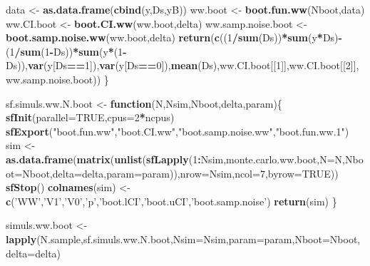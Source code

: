 \documentclass[]{book}
\newenvironment{Shaded}{\begin{snugshade}}{\end{snugshade}}
\newcommand{\KeywordTok}[1]{\textcolor[rgb]{0.13,0.29,0.53}{\textbf{#1}}}
\newcommand{\DataTypeTok}[1]{\textcolor[rgb]{0.13,0.29,0.53}{#1}}
\newcommand{\DecValTok}[1]{\textcolor[rgb]{0.00,0.00,0.81}{#1}}
\newcommand{\StringTok}[1]{\textcolor[rgb]{0.31,0.60,0.02}{#1}}
\newcommand{\OtherTok}[1]{\textcolor[rgb]{0.56,0.35,0.01}{#1}}
\newcommand{\ControlFlowTok}[1]{\textcolor[rgb]{0.13,0.29,0.53}{\textbf{#1}}}
\newcommand{\OperatorTok}[1]{\textcolor[rgb]{0.81,0.36,0.00}{\textbf{#1}}}
\newcommand{\NormalTok}[1]{#1}
\theoremstyle{definition}
\theoremstyle{definition}
\theoremstyle{definition}
\theoremstyle{remark}
\begin{document}
\begin{Shaded}
\begin{Highlighting}[]
\NormalTok{  data <-}\StringTok{ }\KeywordTok{as.data.frame}\NormalTok{(}\KeywordTok{cbind}\NormalTok{(y,Ds,yB))}
\NormalTok{  ww.boot <-}\StringTok{ }\KeywordTok{boot.fun.ww}\NormalTok{(Nboot,data)}
\NormalTok{  ww.CI.boot <-}\StringTok{ }\KeywordTok{boot.CI.ww}\NormalTok{(ww.boot,delta)}
\NormalTok{  ww.samp.noise.boot <-}\StringTok{ }\KeywordTok{boot.samp.noise.ww}\NormalTok{(ww.boot,delta)}
  \KeywordTok{return}\NormalTok{(}\KeywordTok{c}\NormalTok{((}\DecValTok{1}\OperatorTok{/}\KeywordTok{sum}\NormalTok{(Ds))}\OperatorTok{*}\KeywordTok{sum}\NormalTok{(y}\OperatorTok{*}\NormalTok{Ds)}\OperatorTok{-}\NormalTok{(}\DecValTok{1}\OperatorTok{/}\KeywordTok{sum}\NormalTok{(}\DecValTok{1}\OperatorTok{-}\NormalTok{Ds))}\OperatorTok{*}\KeywordTok{sum}\NormalTok{(y}\OperatorTok{*}\NormalTok{(}\DecValTok{1}\OperatorTok{-}\NormalTok{Ds)),}\KeywordTok{var}\NormalTok{(y[Ds}\OperatorTok{==}\DecValTok{1}\NormalTok{]),}\KeywordTok{var}\NormalTok{(y[Ds}\OperatorTok{==}\DecValTok{0}\NormalTok{]),}\KeywordTok{mean}\NormalTok{(Ds),ww.CI.boot[[}\DecValTok{1}\NormalTok{]],ww.CI.boot[[}\DecValTok{2}\NormalTok{]],ww.samp.noise.boot))}
\NormalTok{\}}

\NormalTok{sf.simuls.ww.N.boot <-}\StringTok{ }\ControlFlowTok{function}\NormalTok{(N,Nsim,Nboot,delta,param)\{}
  \KeywordTok{sfInit}\NormalTok{(}\DataTypeTok{parallel=}\OtherTok{TRUE}\NormalTok{,}\DataTypeTok{cpus=}\DecValTok{2}\OperatorTok{*}\NormalTok{ncpus)}
  \KeywordTok{sfExport}\NormalTok{(}\StringTok{"boot.fun.ww"}\NormalTok{,}\StringTok{"boot.CI.ww"}\NormalTok{,}\StringTok{"boot.samp.noise.ww"}\NormalTok{,}\StringTok{"boot.fun.ww.1"}\NormalTok{)}
\NormalTok{  sim <-}\StringTok{ }\KeywordTok{as.data.frame}\NormalTok{(}\KeywordTok{matrix}\NormalTok{(}\KeywordTok{unlist}\NormalTok{(}\KeywordTok{sfLapply}\NormalTok{(}\DecValTok{1}\OperatorTok{:}\NormalTok{Nsim,monte.carlo.ww.boot,}\DataTypeTok{N=}\NormalTok{N,}\DataTypeTok{Nboot=}\NormalTok{Nboot,}\DataTypeTok{delta=}\NormalTok{delta,}\DataTypeTok{param=}\NormalTok{param)),}\DataTypeTok{nrow=}\NormalTok{Nsim,}\DataTypeTok{ncol=}\DecValTok{7}\NormalTok{,}\DataTypeTok{byrow=}\OtherTok{TRUE}\NormalTok{))}
  \KeywordTok{sfStop}\NormalTok{()}
  \KeywordTok{colnames}\NormalTok{(sim) <-}\StringTok{ }\KeywordTok{c}\NormalTok{(}\StringTok{'WW'}\NormalTok{,}\StringTok{'V1'}\NormalTok{,}\StringTok{'V0'}\NormalTok{,}\StringTok{'p'}\NormalTok{,}\StringTok{'boot.lCI'}\NormalTok{,}\StringTok{'boot.uCI'}\NormalTok{,}\StringTok{'boot.samp.noise'}\NormalTok{)}
  \KeywordTok{return}\NormalTok{(sim)}
\NormalTok{\}}

\NormalTok{simuls.ww.boot <-}\StringTok{ }\KeywordTok{lapply}\NormalTok{(N.sample,sf.simuls.ww.N.boot,}\DataTypeTok{Nsim=}\NormalTok{Nsim,}\DataTypeTok{param=}\NormalTok{param,}\DataTypeTok{Nboot=}\NormalTok{Nboot,}\DataTypeTok{delta=}\NormalTok{delta)}
\end{Highlighting}
\end{Shaded}
\end{document}
